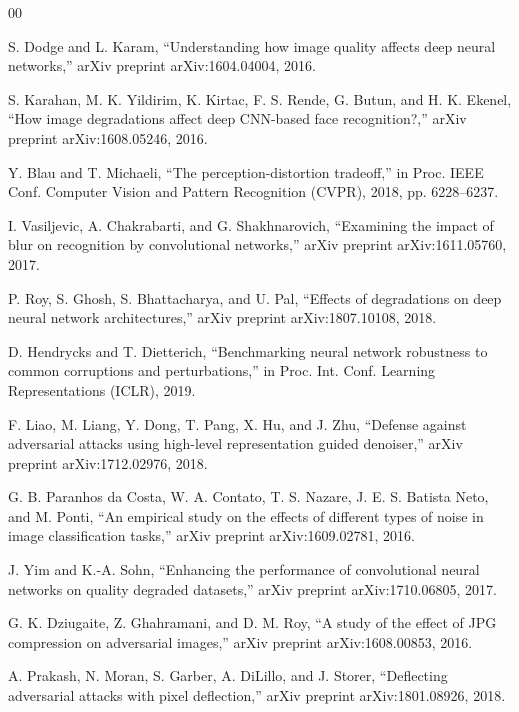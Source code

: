 \documentclass[conference]{IEEEtran}
\begin{document}
\begin{thebibliography}{00}

 S. Dodge and L. Karam, ``Understanding how image quality affects
deep neural networks,'' arXiv preprint arXiv:1604.04004, 2016.

 S. Karahan, M. K. Yildirim, K. Kirtac, F. S. Rende, G. Butun, and
H. K. Ekenel, ``How image degradations affect deep CNN-based face
recognition?,'' arXiv preprint arXiv:1608.05246, 2016.

 Y. Blau and T. Michaeli, ``The perception-distortion tradeoff,''
in Proc. IEEE Conf. Computer Vision and Pattern Recognition (CVPR), 2018, pp.
6228--6237.

 I. Vasiljevic, A. Chakrabarti, and G. Shakhnarovich, ``Examining
the impact of blur on recognition by convolutional networks,'' arXiv preprint
arXiv:1611.05760, 2017.

 P. Roy, S. Ghosh, S. Bhattacharya, and U. Pal, ``Effects of
degradations on deep neural network architectures,'' arXiv preprint
arXiv:1807.10108, 2018.

 D. Hendrycks and T. Dietterich, ``Benchmarking neural network
robustness to common corruptions and perturbations,'' in Proc. Int. Conf.
Learning Representations (ICLR), 2019.

 F. Liao, M. Liang, Y. Dong, T. Pang, X. Hu, and J. Zhu, ``Defense
against adversarial attacks using high-level representation guided denoiser,''
arXiv preprint arXiv:1712.02976, 2018.

 G. B. Paranhos da Costa, W. A. Contato, T. S. Nazare, J. E. S.
Batista Neto, and M. Ponti, ``An empirical study on the effects of different
types of noise in image classification tasks,'' arXiv preprint
arXiv:1609.02781, 2016.

 J. Yim and K.-A. Sohn, ``Enhancing the performance of
convolutional neural networks on quality degraded datasets,'' arXiv preprint
arXiv:1710.06805, 2017.

 G. K. Dziugaite, Z. Ghahramani, and D. M. Roy, ``A study of the
effect of JPG compression on adversarial images,'' arXiv preprint
arXiv:1608.00853, 2016.

 A. Prakash, N. Moran, S. Garber, A. DiLillo, and J. Storer,
``Deflecting adversarial attacks with pixel deflection,'' arXiv preprint
arXiv:1801.08926, 2018.


\end{thebibliography}
\end{document}
